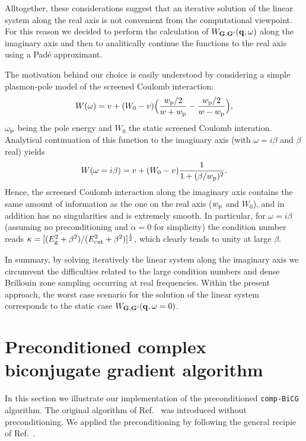 \documentclass[twocolumn,prb,showpacs,superscriptaddress]{revtex4}
\def\w{\omega}
\def\q{{\bf q}}
\def\G{{\bf G}}
\def\Gp{{\bf G^\prime}}
\begin{document}
Alltogether, these considerations suggest that an iterative solution of the
linear system along the real axis is not convenient from the computational
viewpoint. For this reason we decided to perform the calculation of $W_{\G,\Gp}(\q,\w)$
along the imaginary axis and then to analitically continue the functions
to the real axis using a Pad\'e approximant.\cite{pade1,pade2,pade3}

The motivation behind our choice is easily understood by considering a simple
plasmon-pole model of the screened Coulomb interaction:\cite{hl86}
  \begin{equation}
  W(\w) = v + (W_0 -v) \Big( \frac{w_{\rm p}/2}{w+w_{\rm p}} - \frac{w_{\rm p}/2}{w-w_{\rm p}} \Big),
  \end{equation}
$\w_{\rm p}$ being the pole energy and $W_0$ the static screened Coulomb interation.
Analytical continuation of this function to the imaginary axis (with $\w=i\beta$ and $\beta$ real)
yields
  \begin{equation}
  W(\w=i\beta) = v + (W_0 -v) \frac{1}{1+(\beta/w_{\rm p})^2}.
  \end{equation}
Hence, the screened Coulomb interaction along the imaginary axis contains the same
amount of information as the one on the real axis ($w_{\rm p}$ and $W_0$), and 
in addition has no singularities and is extremely smooth.
In particular, for $\w=i\beta$ (assuming no preconditioning
and $\alpha=0$ for simplicity) the condition number reads 
$\kappa=[(E_{\rm g}^2+\beta^2)/(E_{\rm cut}^2+\beta^2)]^\frac{1}{2}$,
which clearly tends to unity at large $\beta$.

In summary, by solving iteratively the linear system along the imaginary
axis we circumvent the difficulties related to the large condition numbers and 
dense Brillouin zone sampling occurring at real frequencies. Within the present
approach, the worst case scenario for the solution of the linear system 
corresponds to the static case $W_{\G,\Gp}(\q,\w=0)$.

\section{Preconditioned complex biconjugate gradient algorithm}

In this section we illustrate our implementation of the preconditioned 
{\tt comp-BiCG} algorithm. The original algorithm of Ref.\ 
was introduced without preconditioning. We applied the preconditioning
by following the general recipie of Ref.\ .
\end{document}
